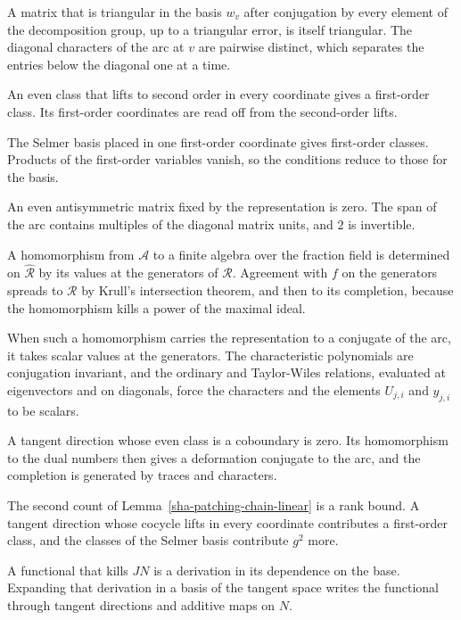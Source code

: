 A matrix that is triangular in the basis $w_v$ after conjugation by every element of the decomposition group, up to a triangular error, is itself triangular. The diagonal characters of the arc at $v$ are pairwise distinct, which separates the entries below the diagonal one at a time.

An even class that lifts to second order in every coordinate gives a first-order class. Its first-order coordinates are read off from the second-order lifts.

The Selmer basis placed in one first-order coordinate gives first-order classes. Products of the first-order variables vanish, so the conditions reduce to those for the basis.

An even antisymmetric matrix fixed by the representation is zero. The span of the arc contains multiples of the diagonal matrix units, and $2$ is invertible.

A homomorphism from $\mathcal A$ to a finite algebra over the fraction field is determined on $\hat{\mathcal R}$ by its values at the generators of $\mathcal R$. Agreement with $f$ on the generators spreads to $\mathcal R$ by Krull's intersection theorem, and then to its completion, because the homomorphism kills a power of the maximal ideal.

When such a homomorphism carries the representation to a conjugate of the arc, it takes scalar values at the generators. The characteristic polynomials are conjugation invariant, and the ordinary and Taylor-Wiles relations, evaluated at eigenvectors and on diagonals, force the characters and the elements $U_{j,i}$ and $y_{j,i}$ to be scalars.

A tangent direction whose even class is a coboundary is zero. Its homomorphism to the dual numbers then gives a deformation conjugate to the arc, and the completion is generated by traces and characters.

The second count of Lemma~\ref{sha-patching-chain-linear} is a rank bound. A tangent direction whose cocycle lifts in every coordinate contributes a first-order class, and the classes of the Selmer basis contribute $g^2$ more.

A functional that kills $JN$ is a derivation in its dependence on the base. Expanding that derivation in a basis of the tangent space writes the functional through tangent directions and additive maps on $N$.

